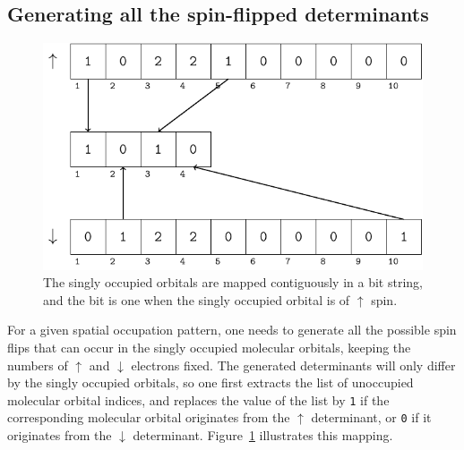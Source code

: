 \documentclass[aip,jcp,reprint,showkeys]{revtex4-1}
\newcommand{\up}{\uparrow}
\newcommand{\dn}{\downarrow}
\newcommand{\sop}{spatial occupation pattern}
\begin{document}
\subsection{Generating all the spin-flipped determinants}

\begin{figure}
\includegraphics[width=0.9\columnwidth]{mapping}
\caption{The singly occupied orbitals are mapped contiguously in a bit string,
and the bit is one when the singly occupied orbital is of $\up$ spin.}
\label{fig:mapping}
\end{figure}





For a given {\sop}, one needs to generate all the possible spin flips that can
occur in the singly occupied molecular orbitals, keeping the numbers of $\up$
and $\dn$ electrons fixed. The generated determinants will only differ by the
singly occupied orbitals,
so one first extracts the list of unoccupied molecular
orbital indices, and replaces the value of the list by 
\texttt{1} if the corresponding molecular orbital originates from the $\up$
determinant, or \texttt{0} if it originates from the $\dn$ determinant. 
Figure~\ref{fig:mapping} illustrates this mapping.
\end{document}
